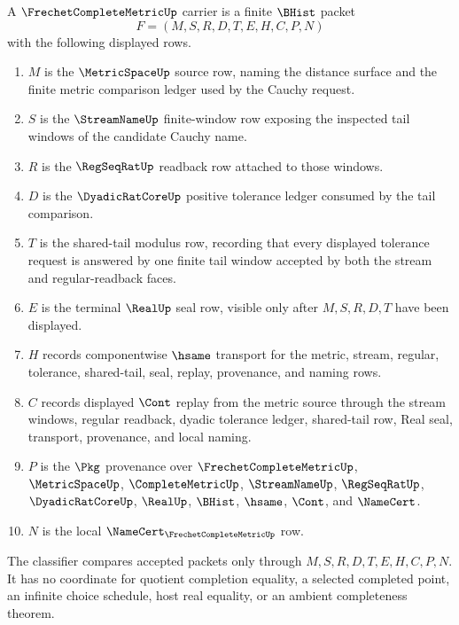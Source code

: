 \begin{definition}
\label{def:cauchy-modulus-shared-tail-carrier}
A $\FrechetCompleteMetricUp$ carrier is a finite $\BHist$ packet
$$
F=(M,S,R,D,T,E,H,C,P,N)
$$
with the following displayed rows.
\begin{enumerate}
\item $M$ is the $\MetricSpaceUp$ source row, naming the distance surface and the finite metric comparison ledger used by the Cauchy request.
\item $S$ is the $\StreamNameUp$ finite-window row exposing the inspected tail windows of the candidate Cauchy name.
\item $R$ is the $\RegSeqRatUp$ readback row attached to those windows.
\item $D$ is the $\DyadicRatCoreUp$ positive tolerance ledger consumed by the tail comparison.
\item $T$ is the shared-tail modulus row, recording that every displayed tolerance request is answered by one finite tail window accepted by both the stream and regular-readback faces.
\item $E$ is the terminal $\RealUp$ seal row, visible only after $M,S,R,D,T$ have been displayed.
\item $H$ records componentwise $\hsame$ transport for the metric, stream, regular, tolerance, shared-tail, seal, replay, provenance, and naming rows.
\item $C$ records displayed $\Cont$ replay from the metric source through the stream windows, regular readback, dyadic tolerance ledger, shared-tail row, Real seal, transport, provenance, and local naming.
\item $P$ is the $\Pkg$ provenance over $\FrechetCompleteMetricUp$, $\MetricSpaceUp$, $\CompleteMetricUp$, $\StreamNameUp$, $\RegSeqRatUp$, $\DyadicRatCoreUp$, $\RealUp$, $\BHist$, $\hsame$, $\Cont$, and $\NameCert$.
\item $N$ is the local $\NameCert_{\FrechetCompleteMetricUp}$ row.
\end{enumerate}
The classifier compares accepted packets only through $M,S,R,D,T,E,H,C,P,N$. It has no coordinate for quotient completion equality, a selected completed point, an infinite choice schedule, host real equality, or an ambient completeness theorem.
\end{definition}

